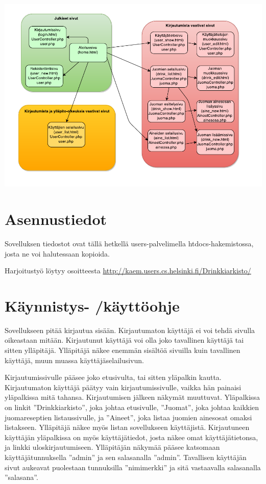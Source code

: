 \documentclass[a4paper]{article}
\begin{document}
\includegraphics[scale=0.8]{sivunakymat.pdf}

\section{Asennustiedot}

Sovelluksen tiedostot ovat tällä hetkellä users-palvelimella htdocs-hakemistossa, josta ne voi halutessaan kopioida.

Harjoitustyö löytyy osoitteesta \url{http://kaem.users.cs.helsinki.fi/Drinkkiarkisto/}


\section{Käynnistys- /käyttöohje}

Sovellukseen pitää kirjautua sisään. Kirjautumaton käyttäjä ei voi tehdä sivulla oikeastaan mitään. Kirjautunut käyttäjä voi olla joko tavallinen käyttäjä tai sitten ylläpitäjä. Ylläpitäjä näkee enemmän sisältöä sivuilla kuin tavallinen käyttäjä, muun muassa käyttäjäselailusivun.

Kirjautumissivulle pääsee joko etusivulta, tai sitten yläpalkin kautta. Kirjautumaton käyttäjä päätyy vain kirjautumissivulle, vaikka hän painaisi yläpalkissa mitä tahansa. Kirjautumisen jälkeen näkymät muuttuvat. Yläpalkissa on linkit ”Drinkkiarkisto”, joka johtaa etusivulle, ”Juomat”, joka johtaa kaikkien
juomareseptien listaussivulle, ja ”Aineet”, joka listaa juomien ainesosat omaksi listakseen. Ylläpitäjä näkee myös listan sovellukseen käyttäjistä. Kirjautuneen käyttäjän yläpalkissa on myös käyttäjätiedot, josta näkee omat käyttäjätietonsa, ja linkki uloskirjautumiseen.
Ylläpitäjän näkymää pääsee katsomaan käyttäjätunnuksella ”admin” ja sen salasanalla ”admin”. Tavallisen käyttäjän sivut aukeavat puolestaan tunnuksilla ”nimimerkki” ja sitä vastaavalla salasanalla ”salasana”.
\end{document}
